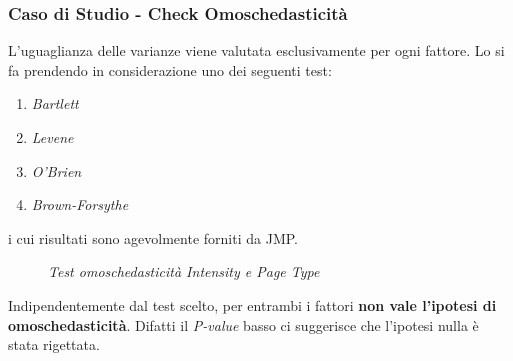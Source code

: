\subsubsection{Caso di Studio - Check Omoschedasticità}
L'uguaglianza delle varianze viene valutata esclusivamente per ogni fattore. Lo si fa prendendo in considerazione uno dei seguenti test:
\begin{enumerate}
	\item \textit{Bartlett}
	\item \textit{Levene}
	\item \textit{O'Brien}
	\item \textit{Brown-Forsythe}
\end{enumerate}
i cui risultati sono agevolmente forniti da JMP.
\begin{figure}[H]
	\caption{\textit{Test omoschedasticità Intensity e Page Type}}
\end{figure}
Indipendentemente dal test scelto, per entrambi i fattori \textbf{non vale l'ipotesi di omoschedasticità}. Difatti il \textit{P-value} basso ci suggerisce che l'ipotesi nulla è stata rigettata.
